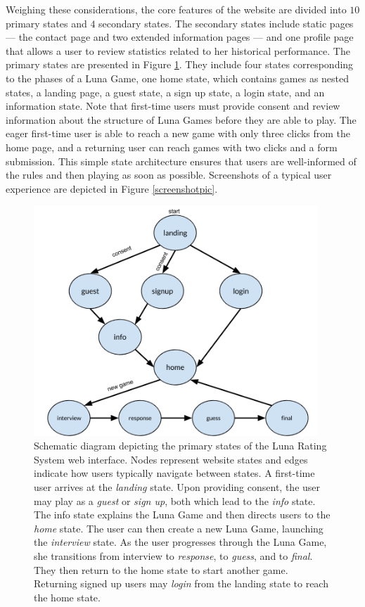Weighing these considerations, the core features of the website are divided into $10$ primary states and $4$ secondary states. The secondary states include static pages --- the contact page and two extended information pages --- and one profile page that allows a user to review statistics related to her historical performance. The primary states are presented in Figure \ref{statediagram}. They include four states corresponding to the phases of a Luna Game, one home state, which contains games as nested states, a landing page, a guest state, a sign up state, a login state, and an information state. Note that first-time users must provide consent and review information about the structure of Luna Games before they are able to play. The eager first-time user is able to reach a new game with only three clicks from the home page, and a returning user can reach games with two clicks and a form submission. This simple state architecture ensures that users are well-informed of the rules and then playing as soon as possible. Screenshots of a typical user experience are depicted in Figure \ref{screenshotpic}.

\begin{figure}
\includegraphics[width=0.95\textwidth]{figures/schematicflow.png}
\caption{Schematic diagram depicting the primary states of the Luna Rating System web interface. Nodes represent website states and edges indicate how users typically navigate between states. A first-time user arrives at the \textit{landing} state. Upon providing consent, the user may play as a \textit{guest} or \textit{sign up}, both which lead to the \textit{info} state. The info state explains the Luna Game and then directs users to the \textit{home} state. The user can then create a new Luna Game, launching the \textit{interview} state. As the user progresses through the Luna Game, she transitions from interview to \textit{response}, to \textit{guess}, and to \textit{final}. They then return to the home state to start another game. Returning signed up users may \textit{login} from the landing state to reach the home state.}
\label{statediagram}
\end{figure}

